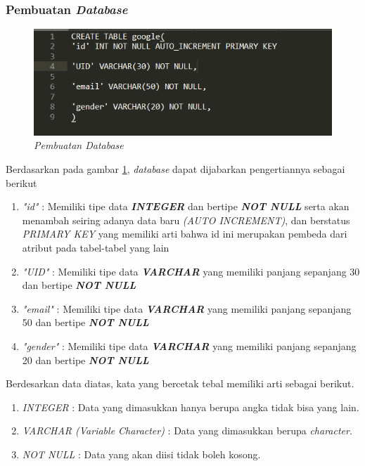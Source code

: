 \subsubsection{Pembuatan \textit{Database}}
\begin{figure}[!htbp]
    \centering
    \includegraphics[scale=0.5]{gambar/buat}
    \caption{\textit{Pembuatan \textit{Database}}}
    \label{pembuatandb}
\end{figure}
\par 
Berdasarkan pada gambar \ref{pembuatandb}, \textit{database} dapat dijabarkan pengertiannya sebagai berikut
\begin{enumerate}
	\item \textit{"id"} : Memiliki tipe data \textit{\textbf{INTEGER}} dan bertipe \textit{\textbf{NOT NULL}}
	serta akan menambah seiring adanya data baru \textit{(AUTO INCREMENT)}, dan berstatus \textit{PRIMARY KEY} yang memiliki arti bahwa id ini merupakan pembeda dari atribut pada tabel-tabel yang lain
	\item \textit{"UID"} : Memiliki tipe data \textit{\textbf{VARCHAR}} yang memiliki panjang sepanjang 30 dan bertipe \textit{\textbf{NOT NULL}}
	\item \textit{"email"} : Memiliki tipe data \textit{\textbf{VARCHAR}} yang memiliki panjang sepanjang 50 dan bertipe \textit{\textbf{NOT NULL}}
	\item \textit{"gender"} : Memiliki tipe data \textit{\textbf{VARCHAR}} yang memiliki panjang sepanjang 20 dan bertipe \textit{\textbf{NOT NULL}}
\end{enumerate}


\par
Berdesarkan data diatas, kata yang bercetak tebal memiliki arti sebagai berikut.
\begin{enumerate}
\item \textit{INTEGER} : Data yang dimasukkan hanya berupa angka tidak bisa yang lain.
\item \textit{VARCHAR (Variable Character)} : Data yang dimasukkan berupa \textit{character}.
\item \textit{NOT NULL} : Data yang akan diisi tidak boleh kosong.
\end{enumerate}
